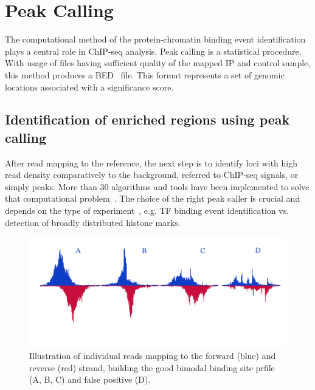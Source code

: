 \chapter{Peak Calling}

The computational method of the protein-chromatin binding event identification plays a central role in ChIP-seq analysis. 
Peak calling is a statistical procedure.
With usage of files having sufficient quality of the mapped IP and control sample, this method produces a BED~\cite{bed} file.
This format represents a set of genomic locations associated with a significance score.

\section{Identification of enriched regions using peak calling}



 
After read mapping to the reference, the next step is to identify loci with high read density comparatively to the background, referred to ChIP-seq signals, or simply peaks.
More than 30 algorithms and tools have been implemented to solve that computational problem~\cite{chen2012systematic}.
The choice of the right peak caller is crucial and depends on the type of experiment~\cite{nakato2017recent}, e.g. TF binding event identification vs. detection of broadly distributed histone marks.


\begin{figure}[b!]
    \centering
    \includegraphics[width=\textwidth]{../img/peaks_final.pdf}
    \caption{Illustration of individual reads mapping to the forward (blue) and reverse (red) strand, building the good bimodal binding site prfile (A, B, C) and false positive (D). }
    \label{peak}
\end{figure}


